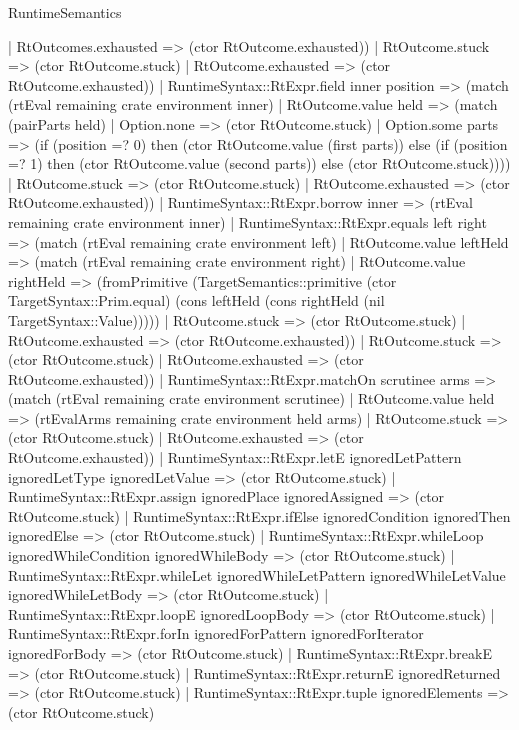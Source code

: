 \begin{lexlean}{RuntimeSemantics}
\begin{semanticmodule}
{          | RtOutcomes.exhausted => (ctor RtOutcome.exhausted))
        | RtOutcome.stuck => (ctor RtOutcome.stuck)
        | RtOutcome.exhausted => (ctor RtOutcome.exhausted))
      | RuntimeSyntax::RtExpr.field inner position => (match (rtEval remaining crate environment inner)
        | RtOutcome.value held => (match (pairParts held)
          | Option.none => (ctor RtOutcome.stuck)
          | Option.some parts => (if (position =? 0) then (ctor RtOutcome.value (first parts)) else (if (position =? 1) then (ctor RtOutcome.value (second parts)) else (ctor RtOutcome.stuck))))
        | RtOutcome.stuck => (ctor RtOutcome.stuck)
        | RtOutcome.exhausted => (ctor RtOutcome.exhausted))
      | RuntimeSyntax::RtExpr.borrow inner => (rtEval remaining crate environment inner)
      | RuntimeSyntax::RtExpr.equals left right => (match (rtEval remaining crate environment left)
        | RtOutcome.value leftHeld => (match (rtEval remaining crate environment right)
          | RtOutcome.value rightHeld => (fromPrimitive (TargetSemantics::primitive (ctor TargetSyntax::Prim.equal) (cons leftHeld (cons rightHeld (nil TargetSyntax::Value)))))
          | RtOutcome.stuck => (ctor RtOutcome.stuck)
          | RtOutcome.exhausted => (ctor RtOutcome.exhausted))
        | RtOutcome.stuck => (ctor RtOutcome.stuck)
        | RtOutcome.exhausted => (ctor RtOutcome.exhausted))
      | RuntimeSyntax::RtExpr.matchOn scrutinee arms => (match (rtEval remaining crate environment scrutinee)
        | RtOutcome.value held => (rtEvalArms remaining crate environment held arms)
        | RtOutcome.stuck => (ctor RtOutcome.stuck)
        | RtOutcome.exhausted => (ctor RtOutcome.exhausted))
      | RuntimeSyntax::RtExpr.letE ignoredLetPattern ignoredLetType ignoredLetValue => (ctor RtOutcome.stuck)
      | RuntimeSyntax::RtExpr.assign ignoredPlace ignoredAssigned => (ctor RtOutcome.stuck)
      | RuntimeSyntax::RtExpr.ifElse ignoredCondition ignoredThen ignoredElse => (ctor RtOutcome.stuck)
      | RuntimeSyntax::RtExpr.whileLoop ignoredWhileCondition ignoredWhileBody => (ctor RtOutcome.stuck)
      | RuntimeSyntax::RtExpr.whileLet ignoredWhileLetPattern ignoredWhileLetValue ignoredWhileLetBody => (ctor RtOutcome.stuck)
      | RuntimeSyntax::RtExpr.loopE ignoredLoopBody => (ctor RtOutcome.stuck)
      | RuntimeSyntax::RtExpr.forIn ignoredForPattern ignoredForIterator ignoredForBody => (ctor RtOutcome.stuck)
      | RuntimeSyntax::RtExpr.breakE => (ctor RtOutcome.stuck)
      | RuntimeSyntax::RtExpr.returnE ignoredReturned => (ctor RtOutcome.stuck)
      | RuntimeSyntax::RtExpr.tuple ignoredElements => (ctor RtOutcome.stuck)
}
\end{semanticmodule}
\end{lexlean}

